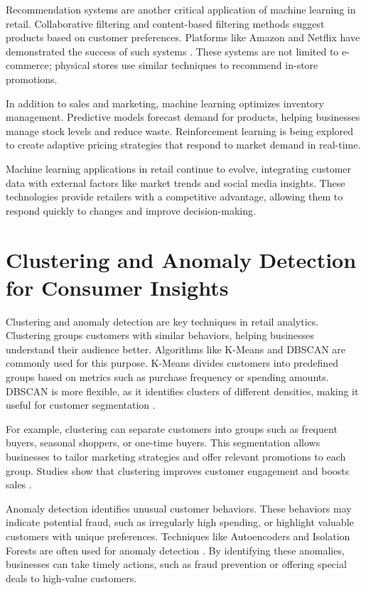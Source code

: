 \documentclass[12pt, a4paper,twoside]{report}
\theoremstyle{plain} %
\theoremstyle{definition} %
\theoremstyle{remark} %
\numberwithin{equation}{chapter}
\begin{document}
Recommendation systems are another critical application of machine learning in retail. Collaborative filtering and content-based filtering methods suggest products based on customer preferences. Platforms like Amazon and Netflix have demonstrated the success of such systems \cite{linden2003amazon}. These systems are not limited to e-commerce; physical stores use similar techniques to recommend in-store promotions.

In addition to sales and marketing, machine learning optimizes inventory management. Predictive models forecast demand for products, helping businesses manage stock levels and reduce waste. Reinforcement learning is being explored to create adaptive pricing strategies that respond to market demand in real-time.

Machine learning applications in retail continue to evolve, integrating customer data with external factors like market trends and social media insights. These technologies provide retailers with a competitive advantage, allowing them to respond quickly to changes and improve decision-making.

\section{Clustering and Anomaly Detection for Consumer Insights}

Clustering and anomaly detection are key techniques in retail analytics. Clustering groups customers with similar behaviors, helping businesses understand their audience better. Algorithms like K-Means and DBSCAN are commonly used for this purpose. K-Means divides customers into predefined groups based on metrics such as purchase frequency or spending amounts. DBSCAN is more flexible, as it identifies clusters of different densities, making it useful for customer segmentation \cite{ester1996density}.

For example, clustering can separate customers into groups such as frequent buyers, seasonal shoppers, or one-time buyers. This segmentation allows businesses to tailor marketing strategies and offer relevant promotions to each group. Studies show that clustering improves customer engagement and boosts sales \cite{xu2020clustering}.

Anomaly detection identifies unusual customer behaviors. These behaviors may indicate potential fraud, such as irregularly high spending, or highlight valuable customers with unique preferences. Techniques like Autoencoders and Isolation Forests are often used for anomaly detection \cite{liu2012isolation}. By identifying these anomalies, businesses can take timely actions, such as fraud prevention or offering special deals to high-value customers.
\end{document}
